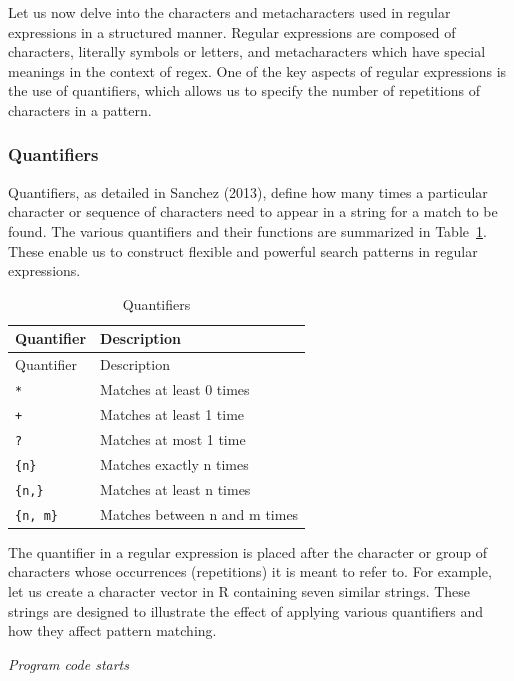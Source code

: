 Let us now delve into the characters and metacharacters used in regular
expressions in a structured manner. Regular expressions are composed of
characters, literally symbols or letters, and metacharacters
which have special meanings in the context of regex. One of the key aspects
of regular expressions is the use of quantifiers, which allows us to
specify the number of repetitions of characters in a pattern.

\subsubsection{Quantifiers}\label{quantifiers}

Quantifiers, as detailed in Sanchez (2013), define how many times a
particular character or sequence of characters need to appear in a string
for a match to be found. The various quantifiers and their functions are
summarized in Table~\ref{tbl-quantifiers1}. These enable us
to construct flexible and powerful search patterns in regular
expressions.

\begin{longtable}[]{@{}ll@{}}
\caption{Quantifiers}\label{tbl-quantifiers1}\tabularnewline
\toprule\noalign{}
Quantifier & Description \\
\midrule\noalign{}
\endfirsthead
\toprule\noalign{}
Quantifier & Description \\
\midrule\noalign{}
\endhead
\bottomrule\noalign{}
\endlastfoot
\texttt{*} & Matches at least 0 times \\
\texttt{+} & Matches at least 1 time \\
\texttt{?} & Matches at most 1 time \\
\texttt{\{n\}} & Matches exactly n times \\
\texttt{\{n,\}} & Matches at least n times \\
\texttt{\{n,\ m\}} & Matches between n and m times \\
\end{longtable}

The quantifier in a regular expression is placed after the character or
group of characters whose occurrences (repetitions) it is meant to
refer to. For example, let us create a character vector in R containing
seven similar strings. These strings are designed to illustrate the
effect of applying various quantifiers and how they affect pattern
matching.

\emph{Program code starts}

\begin{Shaded}
\begin{Highlighting}[]
\OtherTok{\textless{}{-}} \NormalTok{(}\NormalTok{, }\NormalTok{, }\NormalTok{, }\NormalTok{, }\NormalTok{, }\NormalTok{, }\NormalTok{, }\NormalTok{)}
\end{Highlighting}
\end{Shaded}

